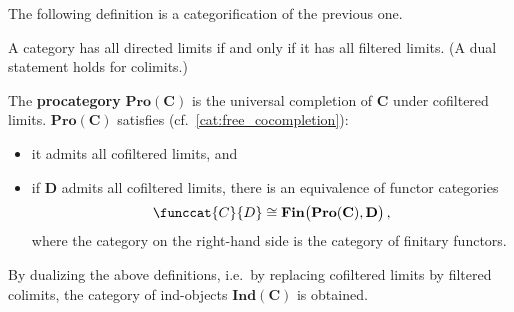     The following definition is a categorification of the previous one.
    \begin{property}\label{cat:directed_filtered}
        A category has all directed limits if and only if it has all filtered limits. (A dual statement holds for colimits.)
    \end{property}


    \begin{uproperty}\label{cat:pro_object_uproperty}
        The \textbf{procategory} $\mathbf{Pro(C)}$ is the universal completion of $\mathbf{C}$ under cofiltered limits. $\mathbf{Pro(C)}$ satisfies (cf.~\cref{cat:free_cocompletion}):
        \begin{itemize}
            \item it admits all cofiltered limits, and
            \item if $\mathbf{D}$ admits all cofiltered limits, there is an equivalence of functor categories
            \begin{gather}
                \funccat{C}{D}\cong\mathbf{Fin}\bigl(\mathbf{Pro(C)},\mathbf{D}\bigr)\,,
            \end{gather}
            where the category on the right-hand side is the category of finitary functors.
        \end{itemize}
    \end{uproperty}
    \begin{remark}
        By dualizing the above definitions, i.e.~by replacing cofiltered limits by filtered colimits, the category of ind-objects $\mathbf{Ind(C)}$ is obtained.
    \end{remark}

